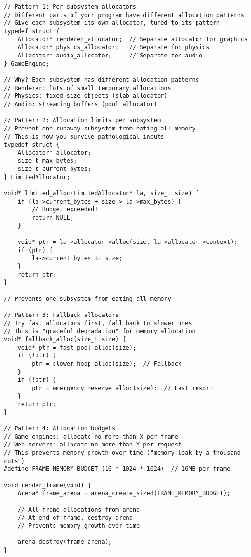 \begin{lstlisting}
// Pattern 1: Per-subsystem allocators
// Different parts of your program have different allocation patterns
// Give each subsystem its own allocator, tuned to its pattern
typedef struct {
    Allocator* renderer_allocator;  // Separate allocator for graphics
    Allocator* physics_allocator;   // Separate for physics
    Allocator* audio_allocator;     // Separate for audio
} GameEngine;

// Why? Each subsystem has different allocation patterns
// Renderer: lots of small temporary allocations
// Physics: fixed-size objects (slab allocator)
// Audio: streaming buffers (pool allocator)

// Pattern 2: Allocation limits per subsystem
// Prevent one runaway subsystem from eating all memory
// This is how you survive pathological inputs
typedef struct {
    Allocator* allocator;
    size_t max_bytes;
    size_t current_bytes;
} LimitedAllocator;

void* limited_alloc(LimitedAllocator* la, size_t size) {
    if (la->current_bytes + size > la->max_bytes) {
        // Budget exceeded!
        return NULL;
    }

    void* ptr = la->allocator->alloc(size, la->allocator->context);
    if (ptr) {
        la->current_bytes += size;
    }
    return ptr;
}

// Prevents one subsystem from eating all memory

// Pattern 3: Fallback allocators
// Try fast allocators first, fall back to slower ones
// This is "graceful degradation" for memory allocation
void* fallback_alloc(size_t size) {
    void* ptr = fast_pool_alloc(size);
    if (!ptr) {
        ptr = slower_heap_alloc(size);  // Fallback
    }
    if (!ptr) {
        ptr = emergency_reserve_alloc(size);  // Last resort
    }
    return ptr;
}

// Pattern 4: Allocation budgets
// Game engines: allocate no more than X per frame
// Web servers: allocate no more than Y per request
// This prevents memory growth over time ("memory leak by a thousand cuts")
#define FRAME_MEMORY_BUDGET (16 * 1024 * 1024)  // 16MB per frame

void render_frame(void) {
    Arena* frame_arena = arena_create_sized(FRAME_MEMORY_BUDGET);

    // All frame allocations from arena
    // At end of frame, destroy arena
    // Prevents memory growth over time

    arena_destroy(frame_arena);
}
\end{lstlisting}


